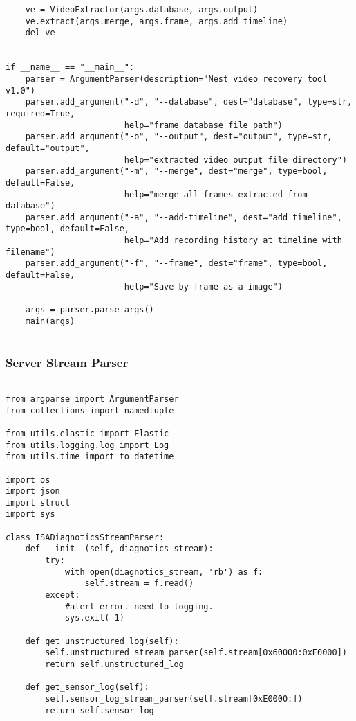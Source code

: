 \documentclass{easychair}
\begin{document}
\begin{enumerate}
\begin{lstlisting}
    ve = VideoExtractor(args.database, args.output)
    ve.extract(args.merge, args.frame, args.add_timeline)
    del ve


if __name__ == "__main__":
    parser = ArgumentParser(description="Nest video recovery tool v1.0")
    parser.add_argument("-d", "--database", dest="database", type=str, required=True,
                        help="frame_database file path")
    parser.add_argument("-o", "--output", dest="output", type=str, default="output",
                        help="extracted video output file directory")
    parser.add_argument("-m", "--merge", dest="merge", type=bool, default=False,
                        help="merge all frames extracted from database")
    parser.add_argument("-a", "--add-timeline", dest="add_timeline", type=bool, default=False,
                        help="Add recording history at timeline with filename")
    parser.add_argument("-f", "--frame", dest="frame", type=bool, default=False,
                        help="Save by frame as a image")

    args = parser.parse_args()
    main(args)


\end{lstlisting}

\subsubsection{Server Stream Parser}

\lstset{language=Python}
\lstset{frame=lines}
\lstset{basicstyle=\footnotesize}
\begin{lstlisting}

from argparse import ArgumentParser
from collections import namedtuple

from utils.elastic import Elastic
from utils.logging.log import Log
from utils.time import to_datetime

import os
import json
import struct
import sys

class ISADiagnoticsStreamParser:
    def __init__(self, diagnotics_stream):
        try:
            with open(diagnotics_stream, 'rb') as f:
                self.stream = f.read()
        except:
            #alert error. need to logging.
            sys.exit(-1)

    def get_unstructured_log(self):
        self.unstructured_stream_parser(self.stream[0x60000:0xE0000])
        return self.unstructured_log

    def get_sensor_log(self):
        self.sensor_log_stream_parser(self.stream[0xE0000:])
        return self.sensor_log


\end{lstlisting}
\end{enumerate}
\end{document}
